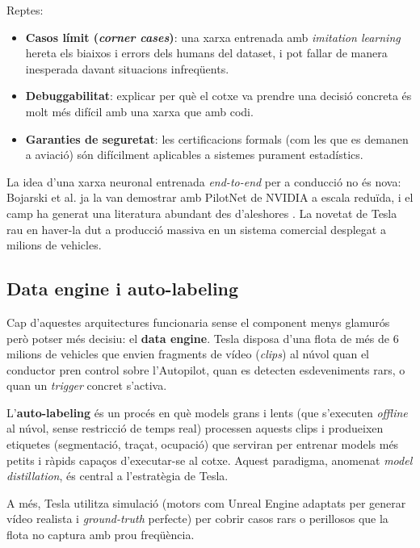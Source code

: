 \documentclass[11pt,a4paper]{article}
\begin{document}
Reptes:

\begin{itemize}[leftmargin=*]
    \item \textbf{Casos límit (\emph{corner cases})}: una xarxa entrenada amb \emph{imitation learning} hereta els biaixos i errors dels humans del dataset, i pot fallar de manera inesperada davant situacions infreqüents.
    \item \textbf{Debuggabilitat}: explicar per què el cotxe va prendre una decisió concreta és molt més difícil amb una xarxa que amb codi.
    \item \textbf{Garanties de seguretat}: les certificacions formals (com les que es demanen a aviació) són difícilment aplicables a sistemes purament estadístics.
\end{itemize}

La idea d'una xarxa neuronal entrenada \emph{end-to-end} per a conducció no és nova: Bojarski et al. \cite{bojarski2016} ja la van demostrar amb PilotNet de NVIDIA a escala reduïda, i el camp ha generat una literatura abundant des d'aleshores \cite{chen2024}. La novetat de Tesla rau en haver-la dut a producció massiva en un sistema comercial desplegat a milions de vehicles.

\subsection{Data engine i auto-labeling}

Cap d'aquestes arquitectures funcionaria sense el component menys glamurós però potser més decisiu: el \textbf{data engine}. Tesla disposa d'una flota de més de 6 milions de vehicles que envien fragments de vídeo (\emph{clips}) al núvol quan el conductor pren control sobre l'Autopilot, quan es detecten esdeveniments rars, o quan un \emph{trigger} concret s'activa.

L'\textbf{auto-labeling} és un procés en què models grans i lents (que s'executen \emph{offline} al núvol, sense restricció de temps real) processen aquests clips i produeixen etiquetes (segmentació, traçat, ocupació) que serviran per entrenar models més petits i ràpids capaços d'executar-se al cotxe. Aquest paradigma, anomenat \emph{model distillation}, és central a l'estratègia de Tesla.

A més, Tesla utilitza simulació (motors com Unreal Engine adaptats per generar vídeo realista i \emph{ground-truth} perfecte) per cobrir casos rars o perillosos que la flota no captura amb prou freqüència.
\end{document}
